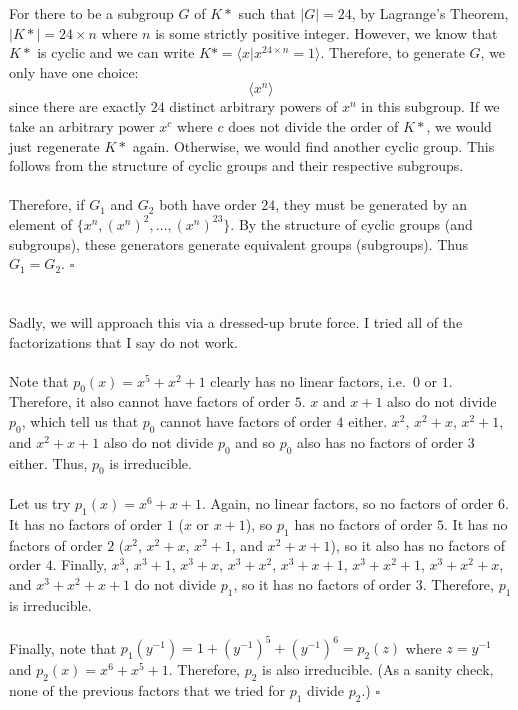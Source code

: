 \documentclass[letterpaper]{article}
\newcommand*{\QED}{\hfill\ensuremath{\square}}%
\begin{document}
For there to be a subgroup $ G $ of $ K* $ such that $ |G| = 24 $, by Lagrange's Theorem, $ |K*| = 24 \times n $ where $ n $ is some strictly positive integer.
However, we know that $ K* $ is cyclic and we can write $ K* = \langle x | x^{24 \times n} = 1 \rangle $.
Therefore, to generate $ G $, we only have one choice:
\[
\langle x^n \rangle
\]
since there are exactly $ 24 $ distinct arbitrary powers of $ x^n $ in this subgroup.
If we take an arbitrary power $ x^c $ where $ c $ does not divide the order of $ K* $, we would just regenerate $ K* $ again.
Otherwise, we would find another cyclic group.
This follows from the structure of cyclic groups and their respective subgroups.
\\ \\
Therefore, if $ G_1 $ and $ G_2 $ both have order $ 24 $, they must be generated by an element of $ \{x^n, {(x^n)}^2, \ldots, {(x^n)}^{23}\} $.
By the structure of cyclic groups (and subgroups), these generators generate equivalent groups (subgroups).
Thus $ G_1 = G_2 $.
\QED{}

\section{}
\label{sec:Question5}

Sadly, we will approach this via a dressed-up brute force.
I tried all of the factorizations that I say do not work.
\\ \\
Note that $ p_0(x) = x^5 + x^2 + 1 $ clearly has no linear factors, i.e.\ $ 0 $ or $ 1 $.
Therefore, it also cannot have factors of order $ 5 $.
$ x $ and $ x + 1 $ also do not divide $ p_0 $, which tell us that $ p_0 $ cannot have factors of order $ 4 $ either.
$ x^2 $, $ x^2 + x $, $ x^2 + 1 $, and $ x^2 + x + 1 $ also do not divide $ p_0 $ and so $ p_0 $ also has no factors of order $ 3 $ either.
Thus, $ p_0 $ is irreducible.
\\ \\
Let us try $ p_1(x) = x^6 + x + 1 $.
Again, no linear factors, so no factors of order $ 6 $.
It has no factors of order $ 1 $ ($ x $ or $ x + 1 $), so $ p_1 $ has no factors of order $ 5 $.
It has no factors of order $ 2 $ ($ x^2 $, $ x^2 + x $, $ x^2 + 1 $, and $ x^2 + x + 1 $), so it also has no factors of order $ 4 $.
Finally, $ x^3 $, $ x^3 + 1 $, $ x^3 + x $, $ x^3 + x^2 $, $ x^3 + x + 1 $, $ x^3 + x^2 + 1 $, $ x^3 + x^2 + x $, and $ x^3 + x^2 + x + 1 $ do not divide $ p_1 $, so it has no factors of order $ 3 $.
Therefore, $ p_1 $ is irreducible.
\\ \\
Finally, note that $ p_1(y^{-1}) = 1 + {(y^{-1})}^5 + {(y^{-1})}^6 = p_2(z) $ where $ z = y^{-1} $ and $ p_2(x) = x^6 + x^5 + 1 $.
Therefore, $ p_2 $ is also irreducible.
(As a sanity check, none of the previous factors that we tried for $ p_1 $ divide $ p_2 $.)
\QED{}
\end{document}
